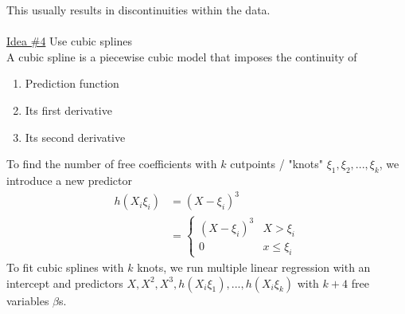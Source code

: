 \documentclass[12pt, letterpaper]{article}
\begin{document}
This usually results in discontinuities within the data. \\ \\
\underline{Idea \#4} Use cubic splines \\
A cubic spline is a piecewise cubic model that imposes the continuity of 
\begin{enumerate}
    \item Prediction function 
    \item Its first derivative
    \item Its second derivative
\end{enumerate}
To find the number of free coefficients with $k$ cutpoints / "knots" $\xi_1, \xi_2,..., \xi_k$, we
introduce a new predictor \begin{align*}
    h(X_i \xi_i) &= (X-\xi_i)^3 \\
    &= \begin{cases}
        (X- \xi_i)^3 & X > \xi_i \\
        0 & x \le \xi_i
    \end{cases}
\end{align*}
To fit cubic splines with $k$ knots, we run multiple linear regression with an intercept and 
predictors $X, X^2, X^3, h(X_i\xi_1), ..., h(X_i \xi_k)$ with $k+4$ free variables $\beta$s.
\end{document}
